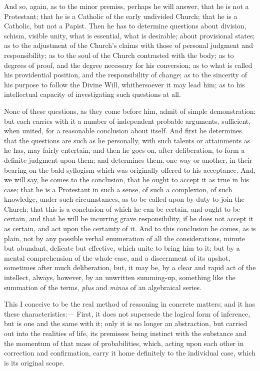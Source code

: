 And so, again, as to the minor premiss, perhaps he will answer,
that he is not a Protestant; that he is a Catholic of the early
undivided Church; that he is a Catholic, but not a Papist. Then he has
to determine questions about division, schism, visible unity, what is
essential, what is desirable; about provisional states; as to the
adjustment of the Church's claims with those of personal judgment and
responsibility; as to the soul of the Church contrasted with the
body; as to degrees of proof, and the degree necessary for his
conversion; as to what is called his providential position, and the
responsibility of change; as to the sincerity of his purpose to follow
the Divine Will, whithersoever it may lead him; as to his intellectual
capacity of investigating such questions at all.

None of these questions, as they come before him, admit of simple
demonstration; but each carries with it a number of independent
probable arguments, sufficient, when united, for a reasonable
conclusion about itself. And first he determines that the questions
are such as he personally, with such talents or attainments as he has,
may fairly entertain; and then he goes on, after deliberation, to form
a definite judgment upon them; and determines them, one way or
another, in their bearing on the bald syllogism which was originally
offered to his acceptance. And, we will say, he comes to the
conclusion, that he ought to accept it as true in his case; that he is
a Protestant in such a sense, of such a complexion, of such knowledge,
under such circumstances, as to be called upon by duty to join the
Church; that this is a conclusion of which he can be certain, and
ought to be certain, and that he will be incurring grave
responsibility, if he does not accept it as certain, and act upon the
certainty of it. And to this conclusion he comes, as is plain, not by
any possible verbal enumeration of all the considerations, minute but
abundant, delicate but effective, which unite to bring him to it; but
by a mental comprehension of the whole case, and a discernment of its
upshot, sometimes after much deliberation, but, it may be, by a
clear and rapid act of the intellect, always, however, by an unwritten
summing-up, something like the summation of the terms, \emph{plus} and
\emph{minus} of an algebraical series.

This I conceive to be the real method of reasoning in concrete
matters; and it has these characteristics:— First, it does not
supersede the logical form of inference, but is one and the same with
it; only it is no longer an abstraction, but carried out into the
realities of life, its premisses being instinct with the substance and
the momentum of that mass of probabilities, which, acting upon each
other in correction and confirmation, carry it home definitely to the
individual case, which is its original scope.

